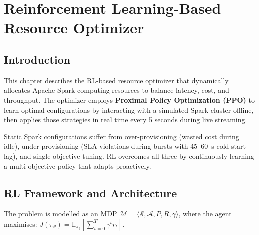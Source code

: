 \chapter{Reinforcement Learning-Based Resource Optimizer}
\label{chap:rl_optimizer}

\section{Introduction}
This chapter describes the RL-based resource optimizer that dynamically allocates
Apache Spark computing resources to balance latency, cost, and throughput. The
optimizer employs \textbf{Proximal Policy Optimization (PPO)} to learn optimal
configurations by interacting with a simulated Spark cluster offline, then applies
those strategies in real time every 5 seconds during live streaming.

Static Spark configurations suffer from over-provisioning (wasted cost during idle),
under-provisioning (SLA violations during bursts with 45--60~s cold-start lag),
and single-objective tuning. RL overcomes all three by continuously learning a
multi-objective policy that adapts proactively.

\section{RL Framework and Architecture}
\label{sec:rl_framework}
The problem is modelled as an MDP
$\mathcal{M} = \langle \mathcal{S}, \mathcal{A}, P, R, \gamma \rangle$,
where the agent maximises:
$J(\pi_\theta) = \mathbb{E}_{\pi_\theta}[\sum_{t=0}^{T} \gamma^t r_t]$.

\begin{center}
\end{center}

